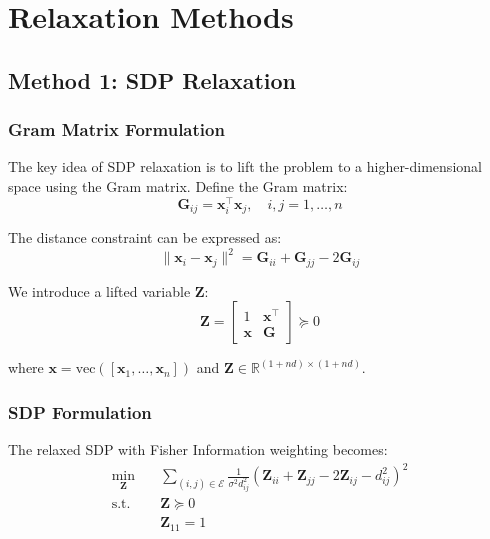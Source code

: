\documentclass[11pt,a4paper]{article}
\begin{document}
\section{Relaxation Methods}

\subsection{Method 1: SDP Relaxation}

\subsubsection{Gram Matrix Formulation}

The key idea of SDP relaxation is to lift the problem to a higher-dimensional space using the Gram matrix. Define the Gram matrix:
\begin{equation}
\mathbf{G}_{ij} = \mathbf{x}_i^\top \mathbf{x}_j, \quad i,j = 1, \ldots, n
\end{equation}

The distance constraint can be expressed as:
\begin{equation}
\|\mathbf{x}_i - \mathbf{x}_j\|^2 = \mathbf{G}_{ii} + \mathbf{G}_{jj} - 2\mathbf{G}_{ij}
\end{equation}

We introduce a lifted variable $\mathbf{Z}$:
\begin{equation}
\mathbf{Z} = \begin{bmatrix}
1 & \mathbf{x}^\top \\
\mathbf{x} & \mathbf{G}
\end{bmatrix} \succeq 0
\end{equation}

where $\mathbf{x} = \text{vec}([\mathbf{x}_1, \ldots, \mathbf{x}_n])$ and $\mathbf{Z} \in \mathbb{R}^{(1+nd) \times (1+nd)}$.

\subsubsection{SDP Formulation}

The relaxed SDP with Fisher Information weighting becomes:
\begin{equation}
\boxed{
\begin{aligned}
\min_{\mathbf{Z}} \quad & \sum_{(i,j) \in \mathcal{E}} \frac{1}{\sigma^2 d_{ij}^2} \left(\mathbf{Z}_{ii} + \mathbf{Z}_{jj} - 2\mathbf{Z}_{ij} - d_{ij}^2\right)^2 \\
\text{s.t.} \quad & \mathbf{Z} \succeq 0 \\
& \mathbf{Z}_{11} = 1
\end{aligned}
}
\label{eq:sdp}
\end{equation}
\end{document}
